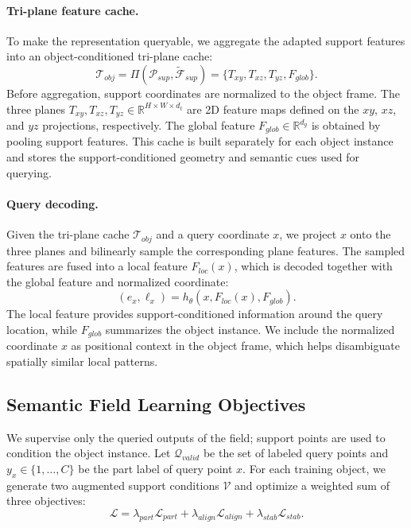   \paragraph{Tri-plane feature cache.}
  To make the representation queryable, we aggregate the adapted support features into an object-conditioned tri-plane cache:
\begin{equation}
  \mathcal{T}_{obj}
  =
  \Pi(\mathcal{P}_{sup},\tilde{\mathcal{F}}_{sup})
  =
  \{T_{xy},T_{xz},T_{yz},F_{glob}\}.
\end{equation}
Before aggregation, support coordinates are normalized to the object frame. The three planes $T_{xy},T_{xz},T_{yz}\in\mathbb{R}^{H\times W\times d_t}$ are 2D feature maps defined on the $xy$, $xz$, and $yz$ projections, respectively. The global feature $F_{glob}\in\mathbb{R}^{d_g}$ is obtained by pooling support
features. This cache is built separately for each object instance and stores the support-conditioned geometry and semantic cues used for querying.

\paragraph{Query decoding.}
Given the tri-plane cache $\mathcal{T}_{obj}$ and a query coordinate $x$, we project $x$ onto the three planes and bilinearly sample the corresponding plane features. The sampled features are fused into a local feature $F_{loc}(x)$, which is decoded together with the global feature and normalized coordinate:
\begin{equation}
  (e_x,\ell_x)
  =
  h_\theta\left(x,F_{loc}(x),F_{glob}\right).
\end{equation}
The local feature provides support-conditioned information around the query location, while $F_{glob}$ summarizes the object instance. We include the normalized coordinate $x$ as positional context in the object frame, which helps disambiguate spatially similar local patterns.


\subsection{Semantic Field Learning Objectives}
  \label{sec:method_losses}

  We supervise only the queried outputs of the field; support points are used to condition the object instance. Let $\mathcal{Q}_{valid}$ be the set of labeled
  query points and $y_x\in\{1,\ldots,C\}$ be the part label of query point $x$. For each training object, we generate two augmented support conditions $\mathcal{V}$
  and optimize a weighted sum of three objectives:
  \begin{equation}
      \mathcal{L}
      =
      \lambda_{part}\mathcal{L}_{part}
      +
      \lambda_{align}\mathcal{L}_{align}
      +
      \lambda_{stab}\mathcal{L}_{stab}.
  \end{equation}

